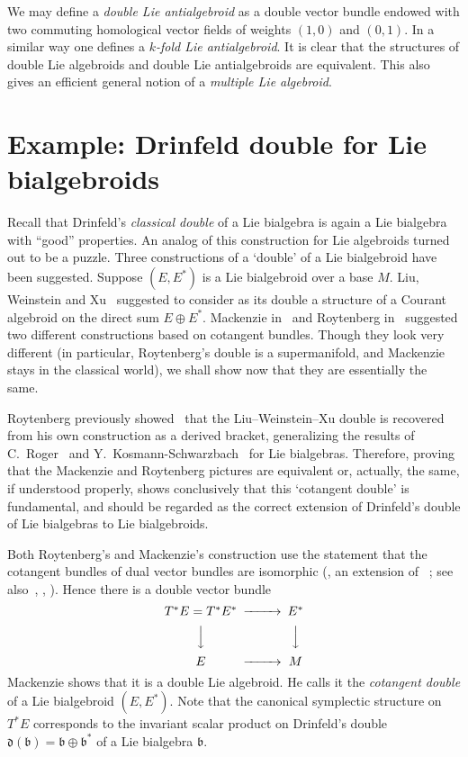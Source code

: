\documentclass[12pt,reqno,a4paper]{amsart}
\theoremstyle{definition}
\begin{document}
We may define a \textit{double Lie antialgebroid} as  a double
vector bundle endowed with two commuting homological vector fields
of weights $(1,0)$ and $(0,1)$. In a similar way one defines a
\textit{$k$-fold Lie antialgebroid}. It is clear that the structures
of  double Lie algebroids and double Lie antialgebroids are
equivalent. This also gives an efficient general notion of a
\textit{multiple Lie algebroid}.

\section{Example: Drinfeld double for Lie bialgebroids}

Recall that Drinfeld's \textit{classical double} of a Lie bialgebra
is again a Lie bialgebra with ``good'' properties. An analog of this
construction for Lie algebroids turned out to be a puzzle.  Three
constructions of a `double' of a Lie bialgebroid have been
suggested. Suppose $(E,E^*)$ is a Lie bialgebroid over a base $M$.
Liu, Weinstein and Xu~\cite{weinstein:liuxu} suggested to consider
as its double a structure of a Courant algebroid on the direct sum
$E\oplus E^*$. Mackenzie in~\cite{mackenzie:doublealg,
mackenzie:doublealg2, mackenzie:drinfeld, mackenzie:notions} and
Roytenberg in~\cite{roytenberg:thesis} suggested two different
constructions based on cotangent bundles. Though they look very
different (in particular, Roytenberg's double is a supermanifold,
and Mackenzie stays in the classical world), we shall  show now that
they are essentially the same.

Roytenberg previously showed~\cite{roytenberg:thesis} that the
Liu--Weinstein--Xu double is recovered from his own construction as
a derived bracket, generalizing the results  of
C.~Roger~\cite{roger:1991} and
Y.~Kosmann-Schwarzbach~\cite{yvette:jacobian, yvette:derived} for
Lie bialgebras. Therefore, proving that the Mackenzie and Roytenberg
pictures  are equivalent or, actually,   the same, if understood
properly, shows conclusively that this `cotangent double' is
fundamental, and should be regarded as the correct extension of
Drinfeld's double of Lie bialgebras to Lie bialgebroids.

Both Roytenberg's and Mackenzie's construction use the statement
that the cotangent bundles of dual vector bundles are isomorphic
(\cite{mackenzie:bialg}, an extension of ~\cite{tulczyjew:1977}; see
also~\cite{mackenzie:diffeomorphisms}, \cite{roytenberg:thesis},
\cite{tv:graded}). Hence there is a double vector bundle
\begin{equation} \label{eq.mackdouble}
    \begin{CD} T^*E=T^*E^*@>>>   E^*\\
                @VVV  @VVV \\
               E@>>>M
    \end{CD}
\end{equation}
Mackenzie shows that it is a double Lie algebroid. He calls it the
\textit{cotangent double} of a Lie bialgebroid $(E,E^*)$. Note that
the canonical symplectic structure on $T^*E$ corresponds to the
invariant scalar product on Drinfeld's double $\mathfrak d
(\mathfrak b)=\mathfrak b\oplus \mathfrak b^*$ of a Lie bialgebra
$\mathfrak b$.
\end{document}
